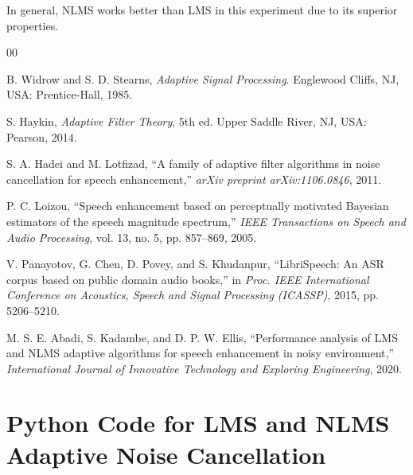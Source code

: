 \documentclass[12pt]{article}
\begin{document}
In general, NLMS works better than LMS in this experiment due to its superior properties.
\newpage
{}
\begin{thebibliography}{00}

B. Widrow and S. D. Stearns, \textit{Adaptive Signal Processing}. Englewood Cliffs, NJ, USA: Prentice-Hall, 1985.

S. Haykin, \textit{Adaptive Filter Theory}, 5th ed. Upper Saddle River, NJ, USA: Pearson, 2014.

S. A. Hadei and M. Lotfizad, ``A family of adaptive filter algorithms in noise cancellation for speech enhancement,'' \textit{arXiv preprint arXiv:1106.0846}, 2011.

P. C. Loizou, ``Speech enhancement based on perceptually motivated Bayesian estimators of the speech magnitude spectrum,'' \textit{IEEE Transactions on Speech and Audio Processing}, vol. 13, no. 5, pp. 857--869, 2005.

V. Panayotov, G. Chen, D. Povey, and S. Khudanpur, ``LibriSpeech: An ASR corpus based on public domain audio books,'' in \textit{Proc. IEEE International Conference on Acoustics, Speech and Signal Processing (ICASSP)}, 2015, pp. 5206--5210.

M. S. E. Abadi, S. Kadambe, and D. P. W. Ellis, ``Performance analysis of LMS and NLMS adaptive algorithms for speech enhancement in noisy environment,'' \textit{International Journal of Innovative Technology and Exploring Engineering}, 2020.

\end{thebibliography}
\newpage
\appendix
\section{Python Code for LMS and NLMS Adaptive Noise Cancellation}
\end{document}
